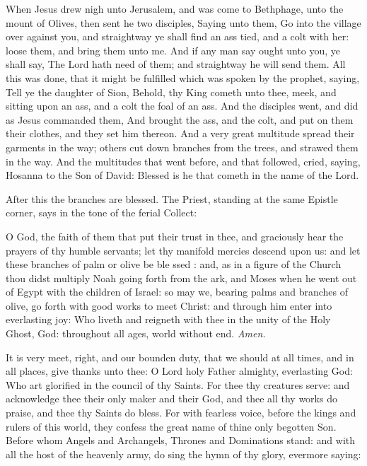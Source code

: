  When Jesus drew nigh unto Jerusalem, and was come to Bethphage, unto the mount of Olives, then sent he two disciples, Saying unto them, Go into the village over against you, and straightway ye shall find an ass tied, and a colt with her: loose them, and bring them unto me. And if any man say ought unto you, ye shall say, The Lord hath need of them; and straightway he will send them. All this was done, that it might be fulfilled which was spoken by the prophet, saying, Tell ye the daughter of Sion, Behold, thy King cometh unto thee, meek, and sitting upon an ass, and a colt the foal of an ass. And the disciples went, and did as Jesus commanded them, And brought the ass, and the colt, and put on them their clothes, and they set him thereon. And a very great multitude spread their garments in the way; others cut down branches from the trees, and strawed them in the way. And the multitudes that went before, and that followed, cried, saying, Hosanna to the Son of David: Blessed is he that cometh in the name of the Lord.
\begin{rubric}
    After this the branches are blessed. The Priest, standing at the same Epistle corner, says in the tone of the ferial Collect:
\end{rubric}
{} O God, the faith of them that put their trust in thee, and graciously hear the prayers of thy humble servants; let thy manifold mercies descend upon us: and let these branches of palm or olive be ble {} ssed : and, as in a figure of the Church thou didst multiply Noah going forth from the ark, and Moses when he went out of Egypt with the children of Israel: so may we, bearing palms and branches of olive, go forth with good works to meet Christ: and through him enter into everlasting joy: Who liveth and reigneth with thee in the unity of the Holy Ghost, God: throughout all ages, world without end. \textit{Amen.}
\par\noindent
It is very meet, right, and our bounden duty, that we should at all times, and in all places, give thanks unto thee: O Lord holy Father almighty, everlasting God: Who art glorified in the council of thy Saints. For thee thy creatures serve: and acknowledge thee their only maker and their God, and thee all thy works do praise, and thee thy Saints do bless. For with fearless voice, before the kings and rulers of this world, they confess the great name of thine only begotten Son. Before whom Angels and Archangels, Thrones and Dominations stand: and with all the host of the heavenly army, do sing the hymn of thy glory, evermore saying:
